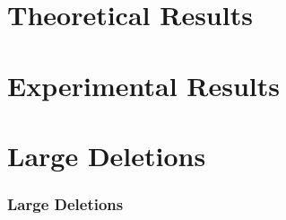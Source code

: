 \documentclass[pdf]{beamer}
\begin{document}
\section{Theoretical Results}

\section{Experimental Results}




\appendix
\section{Large Deletions}
\begin{frame}
  \frametitle{Large Deletions}


\end{frame}
\end{document}
